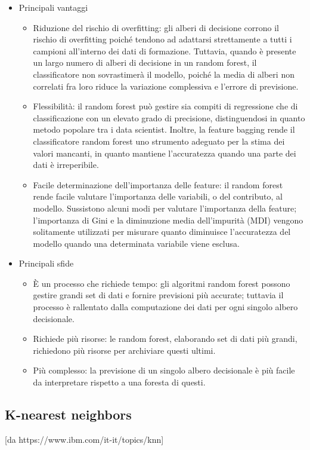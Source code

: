 \begin{itemize}
  \item Principali vantaggi
  \begin{itemize}
    \item Riduzione del rischio di overfitting: gli alberi di decisione corrono il rischio di overfitting poiché tendono ad adattarsi strettamente a tutti i campioni all'interno dei dati di formazione. 
    Tuttavia, quando è presente un largo numero di alberi di decisione in un random forest, il classificatore non sovrastimerà il modello, poiché la media di alberi non correlati fra loro riduce la variazione complessiva e l'errore di previsione.
    \item Flessibilità: il random forest può gestire sia compiti di regressione che di classificazione con un elevato grado di precisione, distinguendosi in quanto metodo popolare tra i data scientist. 
    Inoltre, la feature bagging rende il classificatore random forest uno strumento adeguato per la stima dei valori mancanti, in quanto mantiene l'accuratezza quando una parte dei dati è irreperibile.
    \item Facile determinazione dell'importanza delle feature: il random forest rende facile valutare l'importanza delle variabili, o del contributo, al modello. 
    Sussistono alcuni modi per valutare l'importanza della feature; l’importanza di Gini e la diminuzione media dell'impurità (MDI) vengono solitamente utilizzati per misurare quanto diminuisce l'accuratezza del modello quando una determinata variabile viene esclusa.
  \end{itemize}
  \item Principali sfide
  \begin{itemize}
    \item È un processo che richiede tempo: gli algoritmi random forest possono gestire grandi set di dati e fornire previsioni più accurate; tuttavia il processo è rallentato dalla computazione dei dati per ogni singolo albero decisionale.
    \item Richiede più risorse: le random forest, elaborando set di dati più grandi, richiedono più risorse per archiviare questi ultimi.
    \item Più complesso: la previsione di un singolo albero decisionale è più facile da interpretare rispetto a una foresta di questi.
  \end{itemize}
\end{itemize}


\subsection{K-nearest neighbors}
[da https://www.ibm.com/it-it/topics/knn]

